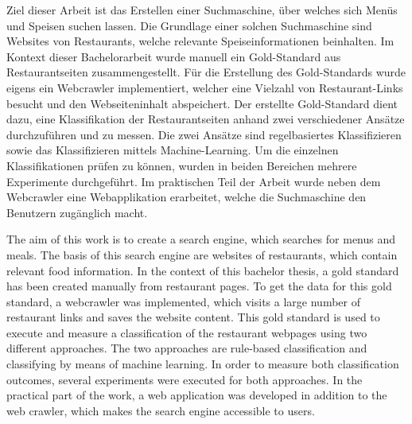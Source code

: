 
Ziel dieser Arbeit ist das Erstellen einer Suchmaschine, über welches sich Menüs und Speisen suchen lassen.
Die Grundlage einer solchen Suchmaschine sind Websites von Restaurants, welche relevante Speiseinformationen beinhalten.
Im Kontext dieser Bachelorarbeit wurde manuell ein Gold-Standard aus Restaurantseiten zusammengestellt.
Für die Erstellung des Gold-Standards wurde eigens ein Webcrawler implementiert, welcher eine Vielzahl von Restaurant-Links besucht und den Webseiteninhalt abspeichert.
Der erstellte Gold-Standard dient dazu, eine Klassifikation der Restaurantseiten anhand zwei verschiedener Ansätze durchzuführen und zu messen.
Die zwei Ansätze sind regelbasiertes Klassifizieren sowie das Klassifizieren mittels Machine-Learning.
Um die einzelnen Klassifikationen prüfen zu können, wurden in beiden Bereichen mehrere Experimente durchgeführt.
Im praktischen Teil der Arbeit wurde neben dem Webcrawler eine Webapplikation erarbeitet, welche die Suchmaschine den Benutzern zugänglich macht.

The aim of this work is to create a search engine, which searches for menus and meals.
The basis of this search engine are websites of restaurants, which contain relevant food information.
In the context of this bachelor thesis, a gold standard has been created manually from restaurant pages.
To get the data for this gold standard, a webcrawler was implemented, which visits a large number of restaurant links and saves the website content.
This gold standard is used to execute and measure a classification of the restaurant webpages using two different approaches.
The two approaches are rule-based classification and classifying by means of machine learning.
In order to measure both classification outcomes, several experiments were executed for both approaches.
In the practical part of the work, a web application was developed in addition to the web crawler, which makes the search engine accessible to users.
